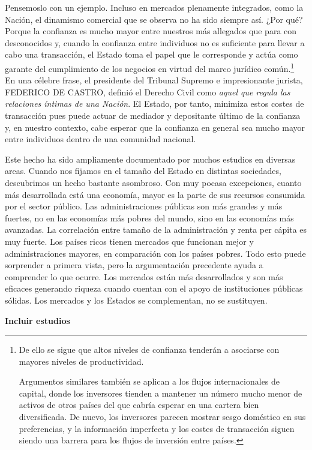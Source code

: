 \documentclass[10pt,a4paper]{article}
\begin{document}
Pensemoslo con un ejemplo. Incluso en mercados plenamente integrados, como la Nación, el dinamismo comercial que se observa no ha sido siempre así. ¿Por qué? Porque la confianza es mucho mayor entre nuestros más allegados que para con desconocidos y, cuando la confianza entre individuos no es suficiente para llevar a cabo una transacción, el Estado toma el papel que le corresponde y actúa como garante del cumplimiento de los negocios en virtud del marco jurídico común.\footnote{%
    De ello se sigue que altos niveles de confianza tenderán a asociarse con mayores niveles de productividad. 

Argumentos similares también se aplican a los flujos internacionales de capital, donde los inversores tienden a mantener un número mucho menor de activos de otros países del que cabría esperar en una cartera bien diversificada. De nuevo, los inversores parecen mostrar sesgo doméstico en sus preferencias, y la información imperfecta y los costes de transacción siguen siendo una barrera para los flujos de inversión entre países.
} En una célebre frase, el presidente del Tribunal Supremo e impresionante jurista, FEDERICO DE CASTRO, definió el Derecho Civil como \textit{aquel que regula las relaciones íntimas de una Nación}. El Estado, por tanto, minimiza estos costes de transacción pues puede actuar de mediador y depositante último de la confianza y, en nuestro contexto, cabe esperar que la confianza en general sea mucho mayor entre individuos dentro de una comunidad nacional.

Este hecho ha sido ampliamente documentado por muchos estudios en diversas areas. Cuando nos fijamos en el tamaño del Estado en distintas sociedades, descubrimos un hecho bastante asombroso. Con muy pocasa excepciones, cuanto más desarrollada está una economía, mayor es la parte de sus recursos consumida por el sector público. Las administraciones públicas son más grandes y más fuertes, no en las economías más pobres del mundo, sino en las economías más avanzadas. La correlación entre tamaño de la administración y renta per cápita es muy fuerte. Los países ricos tienen mercados que funcionan mejor y administraciones mayores, en comparación con los países pobres. Todo esto puede sorprender a primera vista, pero la argumentación precedente ayuda a comprender lo que ocurre. Los mercados están más desarrollados y son más eficaces generando riqueza cuando cuentan con el apoyo de instituciones públicas sólidas. Los mercados y los Estados se complementan, no se sustituyen.

\textbf{Incluir estudios}
\end{document}
